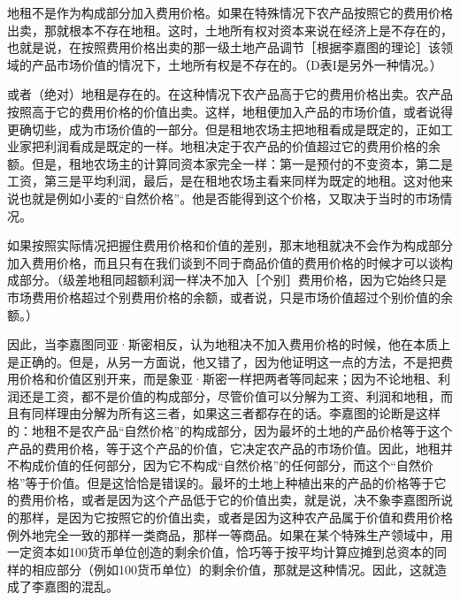 地租不是作为构成部分加入费用价格。如果在特殊情况下农产品按照它的费用价格出卖，那就根本不存在地租。这时，土地所有权对资本来说在经济上是不存在的，也就是说，在按照费用价格出卖的那一级土地产品调节［根据李嘉图的理论］该领域的产品市场价值的情况下，土地所有权是不存在的。（D表I是另外一种情况。）

或者（绝对）地租是存在的。在这种情况下农产品高于它的费用价格出卖。农产品按照高于它的费用价格的价值出卖。这样，地租便加入产品的市场价值，或者说得更确切些，成为市场价值的一部分。但是租地农场主把地租看成是既定的，正如工业家把利润看成是既定的一样。地租决定于农产品的价值超过它的费用价格的余额。但是，租地农场主的计算同资本家完全一样：第一是预付的不变资本，第二是工资，第三是平均利润，最后，是在租地农场主看来同样为既定的地租。这对他来说也就是例如小麦的“自然价格”。他是否能得到这个价格，又取决于当时的市场情况。

如果按照实际情况把握住费用价格和价值的差别，那末地租就决不会作为构成部分加入费用价格，而且只有在我们谈到不同于商品价值的费用价格的时候才可以谈构成部分。（级差地租同超额利润一样决不加入［个别］费用价格，因为它始终只是市场费用价格超过个别费用价格的余额，或者说，只是市场价值超过个别价值的余额。）

因此，当李嘉图同亚·斯密相反，认为地租决不加入费用价格的时候，他在本质上是正确的。但是，从另一方面说，他又错了，因为他证明这一点的方法，不是把费用价格和价值区别开来，而是象亚·斯密一样把两者等同起来；因为不论地租、利润还是工资，都不是价值的构成部分，尽管价值可以分解为工资、利润和地租，而且有同样理由分解为所有这三者，如果这三者都存在的话。李嘉图的论断是这样的：地租不是农产品“自然价格”的构成部分，因为最坏的土地的产品价格等于这个产品的费用价格，等于这个产品的价值，它决定农产品的市场价值。因此，地租并不构成价值的任何部分，因为它不构成“自然价格”的任何部分，而这个“自然价格”等于价值。但是这恰恰是错误的。最坏的土地上种植出来的产品的价格等于它的费用价格，或者是因为这个产品低于它的价值出卖，就是说，决不象李嘉图所说的那样，是因为它按照它的价值出卖，或者是因为这种农产品属于价值和费用价格例外地完全一致的那样一类商品，那样一等商品。如果在某个特殊生产领域中，用一定资本如100货币单位创造的剩余价值，恰巧等于按平均计算应摊到总资本的同样的相应部分（例如100货币单位）的剩余价值，那就是这种情况。因此，这就造成了李嘉图的混乱。

